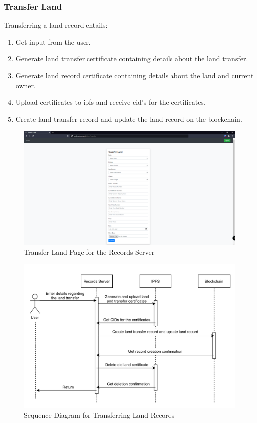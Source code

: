 \documentclass[12pt]{article}
\begin{document}
        \subsubsection{Transfer Land}
            Transferring a land record entails:-
            \begin{enumerate}
                \item Get input from the user.
                \item Generate land transfer certificate containing details about the land transfer.
                \item Generate land record certificate containing details about the land and current owner.
                \item Upload certificates to \acrshort{ipfs} and receive \acrshort{cid}'s for the certificates.
                \item Create land transfer record and update the land record on the blockchain.
            \end{enumerate}
            \begin{figure}[H]
                \includegraphics[scale=0.25]{records_transfer}
                \centering
                \caption{Transfer Land Page for the Records Server}
            \end{figure}

            \begin{figure}[H]
                \includegraphics[scale=0.25]{records_seq_transfer}
                \centering
                \caption{Sequence Diagram for Transferring Land Records}
            \end{figure}
\end{document}
